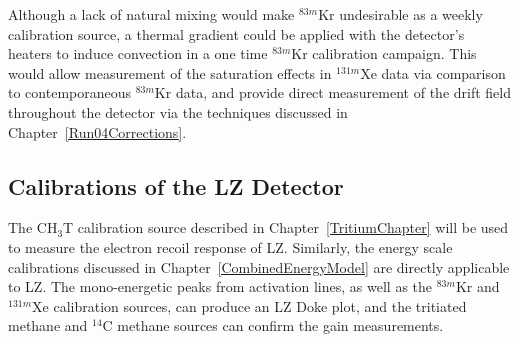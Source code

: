 Although a lack of natural mixing would make $^{83m}$Kr undesirable as a weekly calibration source, a thermal gradient could be applied with the detector's heaters to induce convection in a one time $^{83m}$Kr calibration campaign.  This would allow measurement of the saturation effects in $^{131m}$Xe data via comparison to contemporaneous $^{83m}$Kr data, and provide direct measurement of the drift field throughout the detector via the techniques discussed in Chapter~\ref{Run04Corrections}. 


\subsection{Calibrations of the LZ Detector}

The CH$_3$T calibration source described in Chapter~\ref{TritiumChapter} will be used to measure the electron recoil response of LZ.  Similarly, the energy scale calibrations discussed in Chapter~\ref{CombinedEnergyModel} are directly applicable to LZ.  The mono-energetic peaks from activation lines, as well as the $^{83m}$Kr and $^{131m}$Xe calibration sources, can produce an LZ Doke plot, and the tritiated methane and $^{14}$C methane sources can confirm the gain measurements.

